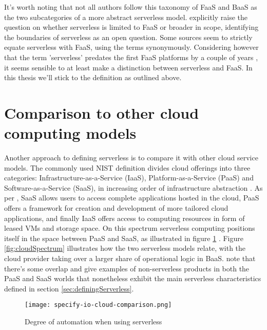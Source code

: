 It's worth noting that not all authors follow this taxonomy of FaaS and BaaS as the two subcategories of a more abstract serverless model. \textcite{baldini17currentTrends} explicitly raise the question on whether serverless is limited to FaaS or broader in scope, identifying the boundaries of serverless as an open question. Some sources \parencite[][among others]{hendrickson16openlambda,mcgrath17implement,varghese18next} seem to strictly equate serverless with FaaS, using the terms synonymously. Considering however that the term 'serverless' predates the first FaaS platforms by a couple of years \parencite{robert2016serverlessarchitectures}, it seems sensible to at least make a distinction between serverless and FaaS. In this thesis we'll stick to the \textcite{cncf18serverlessWG} definition as outlined above.

\section{Comparison to other cloud computing models} \label{sec:comparisonCloud}

Another approach to defining serverless is to compare it with other cloud service models. The commonly used NIST definition \parencite{nist11definitions} divides cloud offerings into three categories: Infrastructure-as-a-Service (IaaS), Platform-as-a-Service (PaaS) and Software-as-a-Service (SaaS), in increasing order of infrastructure abstraction \parencite{nist11definitions}. As per \textcite{buyya2017manifesto}, SaaS allows users to access complete applications hosted in the cloud, PaaS offers a framework for creation and development of more tailored cloud applications, and finally IaaS offers access to computing resources in form of leased VMs and storage space. On this spectrum serverless computing positions itself in the space between PaaS and SaaS, as illustrated in figure \ref{fig:degreeOfAutomation} \parencite{baldini17currentTrends}. Figure \ref{fig:cloudSpectrum} illustrates how the two serverless models relate, with the cloud provider taking over a larger share of operational logic in BaaS. \textcite{van2017spec} note that there's some overlap and give examples of non-serverless products in both the PaaS and SaaS worlds that nonetheless exhibit the main serverless characteristics defined in section \ref{sec:definingServerless}.

\begin{figure}[h]
  \centering
  \texttt{[image: specify-io-cloud-comparison.png]}
  \caption{Degree of automation when using serverless \parencite{wolf16serverless}}
  \label{fig:degreeOfAutomation}
\end{figure}

